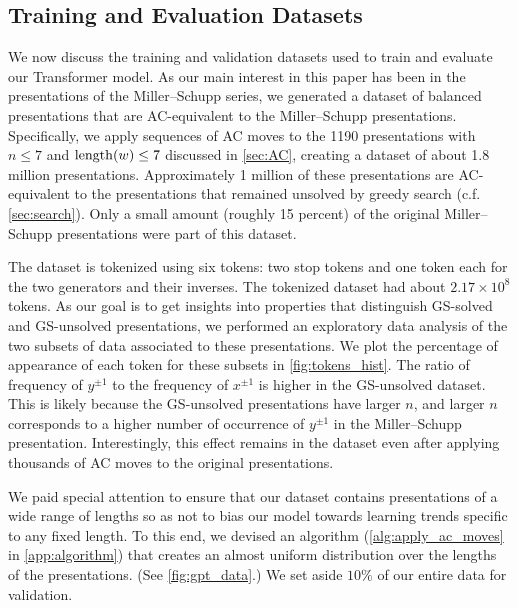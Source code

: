 \subsection{Training and Evaluation Datasets\label{sec:transformer_datasets}}

We now discuss the training and validation datasets used to train and evaluate our Transformer model.
As our main interest in this paper has been in the presentations of the Miller--Schupp series, we generated a dataset of balanced presentations that are AC-equivalent to the Miller--Schupp presentations.
Specifically, we apply sequences of AC moves to the 1190 presentations with $n \leq 7$ and $\operatorname{length}(w) \leq 7$ discussed in \autoref{sec:AC}, creating a dataset of about 1.8 million presentations.
Approximately 1 million of these presentations are AC-equivalent to the presentations that remained unsolved by greedy search (c.f. \autoref{sec:search}).
Only a small amount (roughly 15 percent) of the original Miller--Schupp presentations were part of this dataset.

The dataset is tokenized using six tokens: two stop tokens and one token each for the two generators and their inverses.
The tokenized dataset had about $2.17 \times 10^8$ tokens.
As our goal is to get insights into properties that distinguish GS-solved and GS-unsolved presentations, we performed an exploratory data analysis of the two subsets of data associated to these presentations.
We plot the percentage of appearance of each token for these subsets in \autoref{fig:tokens_hist}.
The ratio of frequency of $y^{\pm 1}$ to the frequency of $x^{\pm 1}$ is higher in the GS-unsolved dataset.
This is likely because the GS-unsolved presentations have larger $n$, and larger $n$ corresponds to a higher number of occurrence of $y^{\pm 1}$ in the Miller--Schupp presentation.
Interestingly, this effect remains in the dataset even after applying thousands of AC moves to the original presentations.

We paid special attention to ensure that our dataset contains presentations of a wide range of lengths so as not to bias our model towards learning trends specific to any fixed length.
To this end, we devised an algorithm (\autoref{alg:apply_ac_moves} in \autoref{app:algorithm}) that creates an almost uniform distribution over the lengths of the presentations.
(See \autoref{fig:gpt_data}.) We set aside $10\%$ of our entire data for validation.

